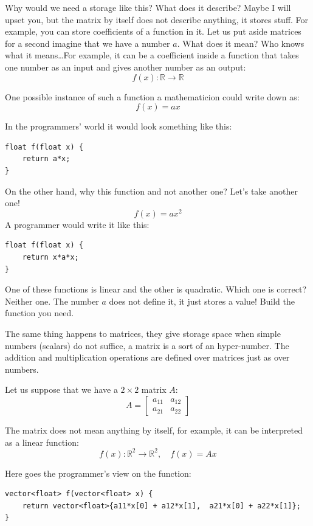 \documentclass[notitlepage,oneside]{book}
\begin{document}
Why would we need a storage like this? What does it describe?
Maybe I will upset you, but the matrix by itself does not describe anything, it stores stuff.
For example, you can store coefficients of a function in it.
Let us put aside matrices for a second imagine that we have a number $a$. What does it mean?
Who knows what it means\dots For example, it can be a coefficient inside a function that takes one number as an input and gives another number as an output:
$$
f(x) : \mathbb R \rightarrow \mathbb R
$$

One possible instance of such a function a mathematicion could write down as:
$$
f(x) = ax
$$

In the programmers' world it would look something like this:
\begin{verbatim}
float f(float x) {
    return a*x;
}
\end{verbatim}

On the other hand, why this function and not another one? Let's take another one!
$$
f(x) = ax^2
$$
A programmer would write it like this:
\begin{verbatim}
float f(float x) {
    return x*a*x;
}
\end{verbatim}

One of these functions is linear and the other is quadratic. Which one is correct? 
Neither one. The number $a$ does not define it, it just stores a value! 
Build the function you need.

The same thing happens to matrices, they give storage space when simple numbers (scalars) do not suffice, a matrix is a sort of an hyper-number.
The addition and multiplication operations are defined over matrices just as over numbers.

Let us suppose that we have a $2\times 2$ matrix $A$:
$$
A=\begin{bmatrix} a_{11} & a_{12} \\ a_{21} & a_{22}\end{bmatrix}
$$

The matrix does not mean anything by itself, for example, it can be interpreted as a linear function:
$$
f(x) : \mathbb R^2 \rightarrow \mathbb R^2, \quad f(x) = Ax
$$

Here goes the programmer's view on the function:
\begin{verbatim}
vector<float> f(vector<float> x) {
    return vector<float>{a11*x[0] + a12*x[1],  a21*x[0] + a22*x[1]};
}
\end{verbatim}
\end{document}
